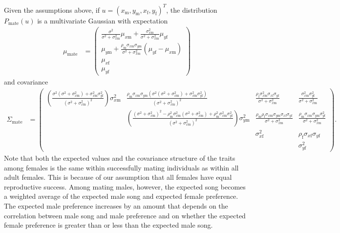 \documentclass{article}
\newcommand{\x}[1]{\text{#1}}
\begin{document}
\begin{claim} \label{covariance}
Given the assumptions above, if $u=(x_\x{m},y_\x{m},x_\x{f},y_\x{f})^T$, the distribution $P_\text{mate}(u)$ is a multivariate Gaussian with expectation 
\begin{align*}
\mu_\text{mate}&=\left(\begin{array}{cc} \frac{\sigma^2}{\sigma^2+\sigma_{x\x{m}}^2}\mu_{x\x{m}}+\frac{\sigma_{x\x{m}}^2}{\sigma^2+\sigma_{x\x{m}}^2}\mu_{y\x{f}} 
\\ \mu_{y\x{m}}+\frac{\rho_\x{m}\sigma_{x\x{m}}\sigma_{y\x{m}}}{\sigma^2+\sigma_{x\x{m}}^2}(\mu_{y\x{f}}-\mu_{x\x{m}})
\\ \mu_{x\x{f}}
\\ \mu_{y\x{f}}
 \end{array}\right)
\end{align*}
and covariance 
\begin{align*}
\Sigma_\text{mate}&=\left(\begin{array}{cccc}\left(\frac{\sigma^2(\sigma^2+\sigma_{x\x{m}}^2)+\sigma_{x\x{m}}^2\sigma_{y\x{f}}^2}{(\sigma^2+\sigma_{x\x{m}}^2)^2}\right)\sigma_{x\x{m}}^2 & \frac{\rho_\x{m}\sigma_{x\x{m}}\sigma_{y\x{m}}(\sigma^2(\sigma^2+\sigma_{x\x{m}}^2)+\sigma_{x\x{m}}^2\sigma_{y\x{f}}^2)}{(\sigma^2+\sigma_{x\x{m}}^2)^2} & \frac{\rho_\x{f}\sigma_{x\x{m}}^2\sigma_{x\x{f}}\sigma_{y\x{f}}}{\sigma^2+\sigma_{x\x{m}}^2} &  \frac{\sigma_{x\x{m}}^2\sigma_{y\x{f}}^2}{\sigma^2+\sigma_{x\x{m}}^2}
\\ & \left(\frac{(\sigma^2+\sigma_{x\x{m}}^2)^2-\rho_\x{m}^2\sigma_{x\x{m}}^2(\sigma^2+\sigma_{x\x{m}}^2)+\rho_\x{m}^2\sigma_{x\x{m}}^2\sigma_{y\x{f}}^2}{(\sigma^2+\sigma_{x\x{m}}^2)^2}\right)\sigma_{y\x{m}}^2 & \frac{\rho_\x{m}\rho_\x{f}\sigma_{x\x{m}}\sigma_{y\x{m}}\sigma_{x\x{f}}\sigma_{y\x{f}}}{\sigma^2+\sigma_{x\x{m}}^2}& \frac{\rho_\x{m}\sigma_{x\x{m}}\sigma_{y\x{m}}\sigma_{y\x{f}}^2}{\sigma^2+\sigma_{x\x{m}}^2}
\\ & & \sigma_{x\x{f}}^2 & \rho_\x{f}\sigma_{x\x{f}}\sigma_{y\x{f}}
\\ & & & \sigma_{y\x{f}}^2
\end{array}\right).
\end{align*}
Note that both the expected values and the covariance structure of the traits among females is the same within successfully mating individuals as within all adult females. This is because of our assumption that all females have equal reproductive success. Among mating males, however, the expected song becomes a weighted average of the expected male song and expected female preference. The expected male preference increases by an amount that depends on the correlation between male song and male preference and on whether the expected female preference is greater than or less than the expected male song. 
\end{claim}
\end{document}
